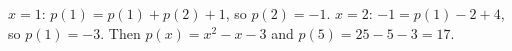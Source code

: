 $x=1$: $p(1)=p(1)+p(2)+1$, so $p(2)=-1$. $x=2$: $-1=p(1)-2+4$, so $p(1)=-3$. Then $p(x)=x^2-x-3$ and $p(5)=25-5-3=\boxed{17}$.
